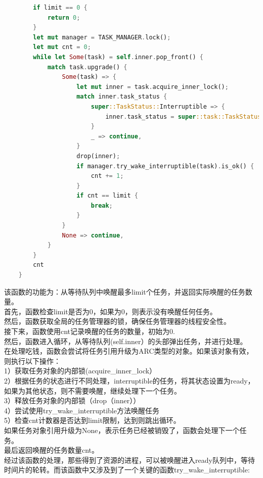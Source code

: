 \begin{lstlisting}[language=rust]
            if limit == 0 {
            return 0;
        }
        let mut manager = TASK_MANAGER.lock();
        let mut cnt = 0;
        while let Some(task) = self.inner.pop_front() {
            match task.upgrade() {
                Some(task) => {
                    let mut inner = task.acquire_inner_lock();
                    match inner.task_status {
                        super::TaskStatus::Interruptible => {
                            inner.task_status = super::task::TaskStatus::Ready
                        }
                        _ => continue,
                    }
                    drop(inner);
                    if manager.try_wake_interruptible(task).is_ok() {
                        cnt += 1;
                    }
                    if cnt == limit {
                        break;
                    }
                }
                None => continue,
            }
        }
        cnt
    }
\end{lstlisting}
该函数的功能为：从等待队列中唤醒最多limit个任务，并返回实际唤醒的任务数量。\\
首先，函数检查limit是否为0，如果为0，则表示没有唤醒任何任务。\\
然后，函数获取全局的任务管理器的锁，确保任务管理器的线程安全性。\\
接下来，函数使用cnt记录唤醒的任务的数量，初始为0.\\
然后，函数进入循环，从等待队列(self.inner）的头部弹出任务，并进行处理。\\
在处理吃钱，函数会尝试将任务引用升级为ARC类型的对象。如果该对象有效，则执行以下操作：\\
1）获取任务对象的内部锁(acquire_inner_lock）\\
2）根据任务的状态进行不同处理，interruptible的任务，将其状态设置为ready，如果为其他状态，则不需要唤醒，继续处理下一个任务。\\
3）释放任务对象的内部锁（drop（inner））\\
4）尝试使用try_wake_interruptible方法唤醒任务\\
5）检查cnt计数器是否达到limit限制，达到则跳出循环。\\
如果任务对象引用升级为None，表示任务已经被销毁了，函数会处理下一个任务。\\
最后返回唤醒的任务数量cnt。\\

经过该函数的处理，那些得到了资源的进程，可以被唤醒进入ready队列中，等待时间片的轮转。而该函数中又涉及到了一个关键的函数try_wake_interruptible:

